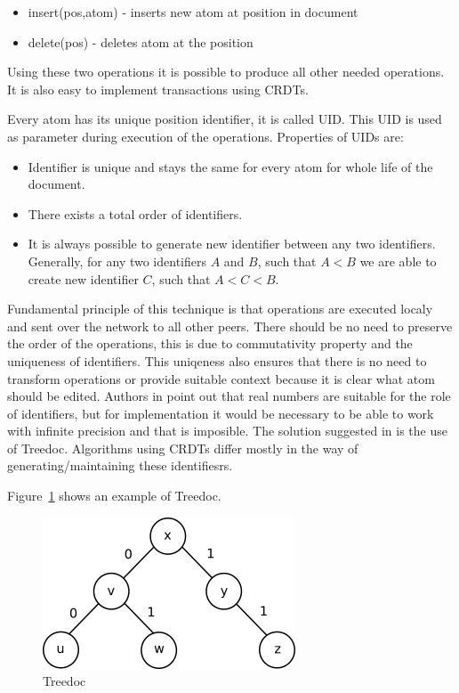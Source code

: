\documentclass[12pt,oneside]{fithesis2}
\begin{document}
\begin{itemize}
\item insert(pos,atom) - inserts new atom at position in document
\item delete(pos) - deletes atom at the position 
\end{itemize}
Using these two operations it is possible to produce all other needed operations. It is also easy to implement transactions using CRDTs. 
\par Every atom has its unique position identifier, it is called UID. This UID is used as parameter during execution of the operations. Properties of UIDs are:
\begin{itemize}
\item Identifier is unique and stays the same for every atom for whole life of the document.
\item There exists a total order of identifiers.
\item It is always possible to generate new identifier between any two identifiers. Generally, for any two identifiers \(A\) and \(B\), such that \(A < B\) we are able to create new identifier \(C\), such that \(A < C < B\).
\end{itemize}
\par Fundamental principle of this technique is that operations are executed localy and sent over the network to all other peers. There should be no need to preserve the order of the operations, this is due to commutativity property and the uniqueness of identifiers. This uniqeness also ensures that there is no need to transform operations or provide suitable context because it is clear what atom should be edited.
Authors in \cite{Shapiro-design} point out that real numbers are suitable for the role of identifiers, but for implementation it would be necessary to be able to work with infinite precision and that is imposible. The solution suggested in \cite{Shapiro-design} is the use of Treedoc. Algorithms using CRDTs differ mostly in the way of generating/maintaining these identifiesrs.
\par Figure~\ref{fig:treedoc} shows an example of Treedoc.
\begin{figure}[H]
\caption{Treedoc}
\label{fig:treedoc}
\centering
\vspace{5mm}
\includegraphics{treedoc1} 
\end{figure}
\end{document}
